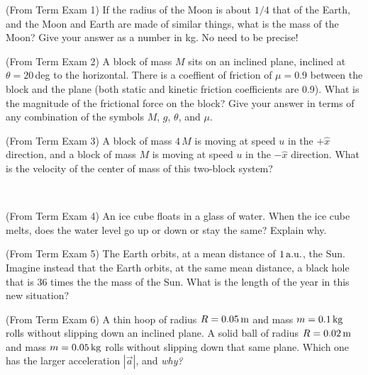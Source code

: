 \documentclass[12pt, letterpaper]{article}
\begin{document}

\begin{problem} (From Term Exam 1)
  If the radius of the Moon is about $1/4$ that of the Earth,
  and the Moon and Earth are made of similar things,
  what is the mass of the Moon?
  Give your answer as a number in kg. No need to be precise!
\end{problem}

\vfill

\begin{problem} (From Term Exam 2)
  A block of mass $M$ sits on an inclined plane, inclined at $\theta=20$\,deg to the horizontal.
  There is a coeffient of friction of $\mu = 0.9$ between the block and the plane
  (both static and kinetic friction coefficients are 0.9).
  What is the magnitude of the frictional force on the block?
  Give your answer in terms of any combination of the symbols $M$, $g$, $\theta$, and $\mu$.
\end{problem}

\vfill

\begin{problem} (From Term Exam 3)
  A block of mass $4\,M$ is moving at speed $u$ in the $+\hat{x}$ direction,
  and a block of mass $M$ is moving at speed $u$ in the $-\hat{x}$ direction.
  What is the velocity of the center of mass of this two-block system?
\end{problem}

\vfill
~\clearpage

\begin{problem} (From Term Exam 4)
  An ice cube floats in a glass of water.
  When the ice cube melts, does the water level go up or down or stay the same?
  Explain why.
\end{problem}

\vfill

\begin{problem} (From Term Exam 5)
  The Earth orbits, at a mean distance of $1\,\mathrm{a.u.}$, the Sun.
  Imagine instead that the Earth orbits, at the same mean distance, a black hole that is 36 times the the mass of the Sun.
  What is the length of the year in this new situation?
\end{problem}

\vfill

\begin{problem} (From Term Exam 6)
  A thin hoop of radius $R=0.05\,\mathrm{m}$ and mass $m=0.1\,\mathrm{kg}$ rolls without slipping down an inclined plane.
  A solid ball of radius $R=0.02\,\mathrm{m}$ and mass $m=0.05\,\mathrm{kg}$ rolls without slipping down that same plane.
  Which one has the larger acceleration $|\vec{a}|$, and \emph{why?}
\end{problem}
\end{document}
